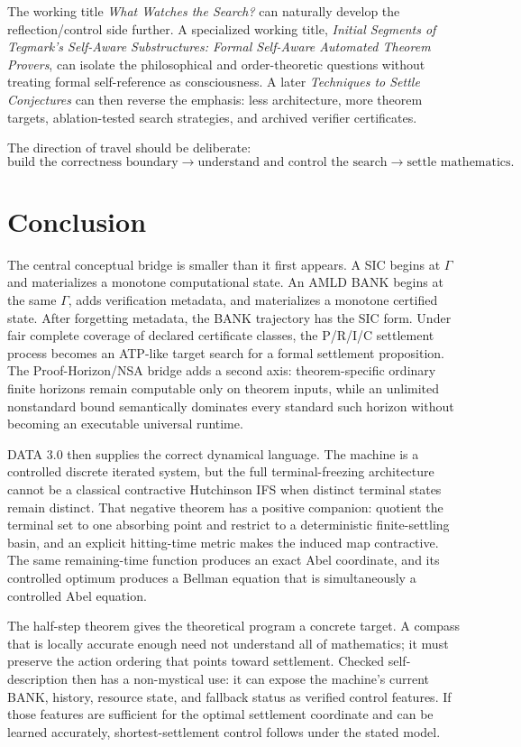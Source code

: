 \documentclass[11pt]{article}
\theoremstyle{definition}
\theoremstyle{remark}
\begin{document}
The working title \emph{What Watches the Search?} can naturally develop the reflection/control side further. A specialized working title, \emph{Initial Segments of Tegmark's Self-Aware Substructures: Formal Self-Aware Automated Theorem Provers}, can isolate the philosophical and order-theoretic questions without treating formal self-reference as consciousness. A later \emph{Techniques to Settle Conjectures} can then reverse the emphasis: less architecture, more theorem targets, ablation-tested search strategies, and archived verifier certificates.

The direction of travel should be deliberate:
\[
\boxed{\text{build the correctness boundary}}
\to
\boxed{\text{understand and control the search}}
\to
\boxed{\text{settle mathematics}.}
\]

\section{Conclusion}

The central conceptual bridge is smaller than it first appears. A SIC begins at $\Gamma$ and materializes a monotone computational state. An AMLD BANK begins at the same $\Gamma$, adds verification metadata, and materializes a monotone certified state. After forgetting metadata, the BANK trajectory has the SIC form. Under fair complete coverage of declared certificate classes, the P/R/I/C settlement process becomes an ATP-like target search for a formal settlement proposition. The Proof-Horizon/NSA bridge adds a second axis: theorem-specific ordinary finite horizons remain computable only on theorem inputs, while an unlimited nonstandard bound semantically dominates every standard such horizon without becoming an executable universal runtime.

DATA 3.0 then supplies the correct dynamical language. The machine is a controlled discrete iterated system, but the full terminal-freezing architecture cannot be a classical contractive Hutchinson IFS when distinct terminal states remain distinct. That negative theorem has a positive companion: quotient the terminal set to one absorbing point and restrict to a deterministic finite-settling basin, and an explicit hitting-time metric makes the induced map contractive. The same remaining-time function produces an exact Abel coordinate, and its controlled optimum produces a Bellman equation that is simultaneously a controlled Abel equation.

The half-step theorem gives the theoretical program a concrete target. A compass that is locally accurate enough need not understand all of mathematics; it must preserve the action ordering that points toward settlement. Checked self-description then has a non-mystical use: it can expose the machine's current BANK, history, resource state, and fallback status as verified control features. If those features are sufficient for the optimal settlement coordinate and can be learned accurately, shortest-settlement control follows under the stated model.
\end{document}
